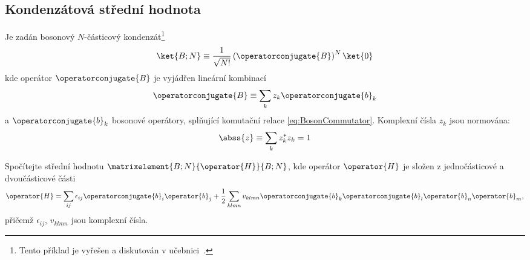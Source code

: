 \subsection{Kondenzátová střední hodnota}
	Je zadán bosonový $N$-částicový kondenzát\footnote{
		Tento příklad je vyřešen a diskutován v učebnici~\cite{Cejnar2013}.
	}
	\begin{equation}
		\ket{B;N}
			\equiv\frac{1}{\sqrt{N!}}\left(\operatorconjugate{B}\right)^{N}\ket{0}
	\end{equation}
	kde operátor $\operatorconjugate{B}$ je vyjádřen lineární kombinací
	\begin{equation}
		\operatorconjugate{B}
			\equiv\sum_{k}z_{k}\operatorconjugate{b}_{k}
	\end{equation}
	a $\operatorconjugate{b}_{k}$ bosonové operátory, splňující komutační relace \eqref{eq:BosonCommutator}.
	Komplexní čísla $z_{k}$ jsou normována:
	\begin{equation}
		\abss{z}\equiv\sum_{k}z_{k}^{*}z_{k}=1
	\end{equation}

	Spočítejte střední hodnotu $\matrixelement{B;N}{\operator{H}}{B;N}$, kde operátor $\operator{H}$ je složen z jednočásticové a dvoučásticové části
	\begin{equation}
		\operator{H}
			=\sum_{ij}\epsilon_{ij}\operatorconjugate{b}_{i}\operator{b}_{j}
				+\frac{1}{2}\sum_{klmn}v_{klmn}\operatorconjugate{b}_{k}\operatorconjugate{b}_{l}\operator{b}_{n}\operator{b}_{m},
	\end{equation}
	přičemž $\epsilon_{ij}$, $v_{klmn}$ jsou komplexní čísla.
	
